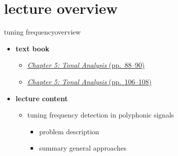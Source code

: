 

\subtitle{Part 6.5: Tuning Frequency Estimation}


	

    \section[overview]{lecture overview}
        \begin{frame}{tuning frequency}{overview}
            \begin{itemize}
                \item   \textbf{text book}  
                    \begin{itemize}
                        \item   \href{http://ieeexplore.ieee.org/xpl/articleDetails.jsp?tp=&arnumber=6331122&}{\underline{\textit{Chapter 5: Tonal Analysis} (pp.~88--90)}}
                        \item   \href{http://ieeexplore.ieee.org/xpl/articleDetails.jsp?tp=&arnumber=6331122&}{\underline{\textit{Chapter 5: Tonal Analysis} (pp.~106--108)}}
                    \end{itemize}
                \bigskip
                \item<2->   \textbf{lecture content}
                    \begin{itemize}
                        \item<2->   tuning frequency detection in polyphonic signals
                            \begin{itemize}
                                \item   problem description
                                \item   summary general approaches
                            \end{itemize}
                    \end{itemize}
            \end{itemize}
        \end{frame}


